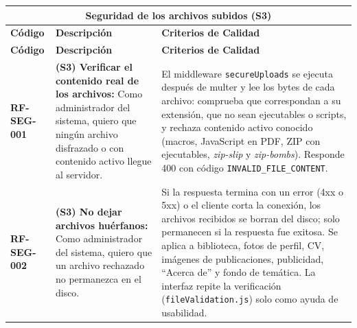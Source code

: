 \begin{longtable}{|l||p{7cm}|p{4.5cm}|}

\multicolumn{3}{c}{Seguridad de los archivos subidos (S3)}\\
\hline\hline
\textbf{Código} & \textbf{Descripción} & \textbf{Criterios de Calidad}\\
\hline
\endfirsthead
\textbf{Código} & \textbf{Descripción} & \textbf{Criterios de Calidad}\\
\hline\hline
\endhead

\textbf{RF-SEG-001} & \textbf{(S3) Verificar el contenido real de los archivos:} Como administrador del sistema, quiero que ningún archivo disfrazado o con contenido activo llegue al servidor. & El middleware \texttt{secureUploads} se ejecuta después de multer y lee los bytes de cada archivo: comprueba que correspondan a su extensión, que no sean ejecutables o scripts, y rechaza contenido activo conocido (macros, JavaScript en PDF, ZIP con ejecutables, \textit{zip-slip} y \textit{zip-bombs}). Responde 400 con código \texttt{INVALID\_FILE\_CONTENT}. \\
\hline
\textbf{RF-SEG-002} & \textbf{(S3) No dejar archivos huérfanos:} Como administrador del sistema, quiero que un archivo rechazado no permanezca en el disco. & Si la respuesta termina con un error (4xx o 5xx) o el cliente corta la conexión, los archivos recibidos se borran del disco; solo permanecen si la respuesta fue exitosa. Se aplica a biblioteca, fotos de perfil, CV, imágenes de publicaciones, publicidad, ``Acerca de'' y fondo de temática. La interfaz repite la verificación (\texttt{fileValidation.js}) solo como ayuda de usabilidad. \\
\hline
\end{longtable}
